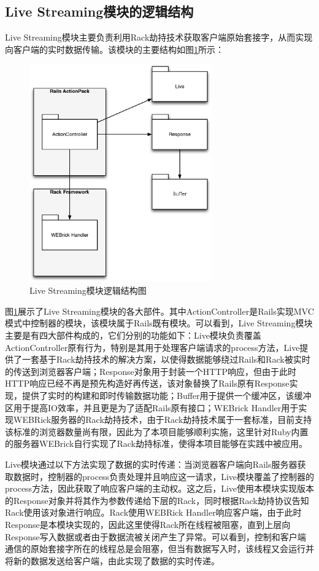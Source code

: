 \subsection{Live Streaming模块的逻辑结构}
Live Streaming模块主要负责利用Rack劫持技术获取客户端原始套接字，从而实现向客户端的实时数据传输。该模块的主要结构如图\ref{fig-live}所示：

\begin{figure}[h]
\centering
\includegraphics[width=0.7\textwidth]{images/overview/live_streaming.eps}
\caption{Live Streaming模块逻辑结构图}
\label{fig-live}
\end{figure}

图\ref{fig-live}展示了Live Streaming模块的各大部件。其中ActionController是Rails实现MVC模式中控制器的模块，该模块属于Rails既有模块。可以看到，Live Streaming模块主要是有四大部件构成的，它们分别的功能如下：Live模块负责覆盖ActionController原有行为，特别是其用于处理客户端请求的process方法，Live提供了一套基于Rack劫持技术的解决方案，以使得数据能够绕过Rails和Rack被实时的传送到浏览器客户端；Response对象用于封装一个HTTP响应，但由于此时HTTP响应已经不再是预先构造好再传送，该对象替换了Rails原有Response实现，提供了实时的构建和即时传输数据功能；Buffer用于提供一个缓冲区，该缓冲区用于提高IO效率，并且更是为了适配Rails原有接口；WEBrick Handler用于实现WEBRick服务器的Rack劫持技术，由于Rack劫持技术属于一套标准，目前支持该标准的浏览器数量尚有限，因此为了本项目能够顺利实施，这里针对Ruby内置的服务器WEBrick自行实现了Rack劫持标准，使得本项目能够在实践中被应用。

Live模块通过以下方法实现了数据的实时传递：当浏览器客户端向Rails服务器获取数据时，控制器的process负责处理并且响应这一请求，Live模块覆盖了控制器的process方法，因此获取了响应客户端的主动权。这之后，Live使用本模块实现版本的Response对象并将其作为参数传递给下层的Rack，同时根据Rack劫持协议告知Rack使用该对象进行响应。Rack使用WEBRick Handler响应客户端，由于此时Response是本模块实现的，因此这里使得Rack所在线程被阻塞，直到上层向Response写入数据或者由于数据流被关闭产生了异常。可以看到，控制和客户端通信的原始套接字所在的线程总是会阻塞，但当有数据写入时，该线程又会运行并将新的数据发送给客户端，由此实现了数据的实时传递。


